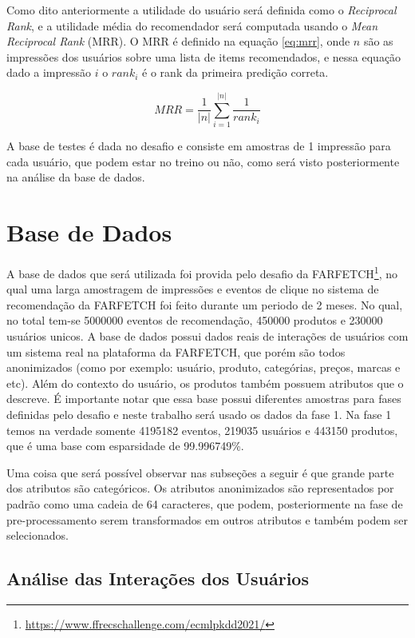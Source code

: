 \documentclass{article}
\begin{document}
Como dito anteriormente a utilidade do usuário será definida como o \textit{Reciprocal Rank}, e a utilidade média do recomendador será computada usando o \textit{Mean Reciprocal Rank} (MRR). O MRR é definido na equação \ref{eq:mrr}, onde $n$ são as impressões dos usuários sobre uma lista de items recomendados, e nessa equação dado a impressão $i$ o $rank_i$ é o rank da primeira predição correta.

\begin{equation}
   \label{eq:mrr}
   MRR = \frac{1}{|n|}\sum_{i=1}^{|n|}\frac{1}{rank_i}
\end{equation}

A base de testes é dada no desafio e consiste em amostras de 1 impressão para cada usuário, que podem estar no treino ou não, como será visto posteriormente na análise da base de dados.

\section{Base de Dados}

A base de dados que será utilizada foi provida pelo desafio da FARFETCH\footnote{\url{https://www.ffrecschallenge.com/ecmlpkdd2021/}}, no qual uma larga amostragem de impressões e eventos de clique no sistema de recomendação da FARFETCH foi feito durante um periodo de 2 meses. No qual, no total tem-se 5000000 eventos de recomendação, 450000 produtos e 230000 usuários unicos. A base de dados possui dados reais de interações de usuários com um sistema real na plataforma da FARFETCH, que porém são todos anonimizados (como por exemplo: usuário, produto, categórias, preços, marcas e etc). Além do contexto do usuário, os produtos também possuem atributos que o descreve. É importante notar que essa base possui diferentes amostras para fases definidas pelo desafio e neste trabalho será usado os dados da fase 1. Na fase 1 temos na verdade somente 4195182 eventos, 219035 usuários e 443150 produtos, que é uma base com esparsidade de 99.996749\%.

Uma coisa que será possível observar nas subseções a seguir é que grande parte dos atributos são categóricos. Os atributos anonimizados são representados por padrão como uma cadeia de 64 caracteres, que podem, posteriormente na fase de pre-processamento serem transformados em outros atributos e também podem ser selecionados.

\subsection{Análise das Interações dos Usuários}
\end{document}
